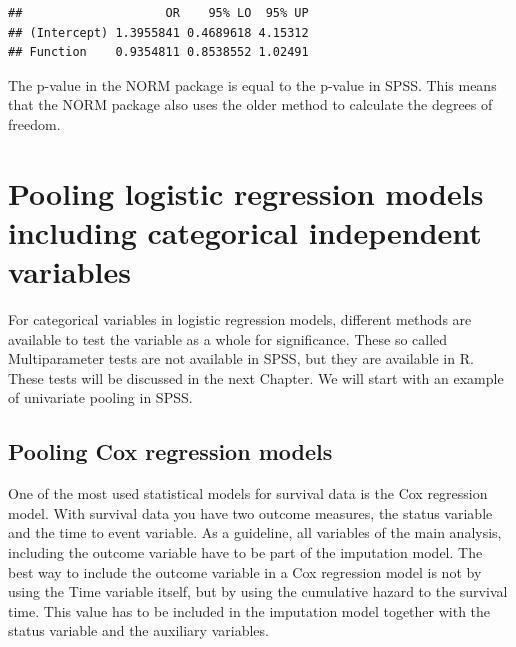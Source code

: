 \documentclass[]{book}
\newenvironment{Shaded}{\begin{snugshade}}{\end{snugshade}}
\newcommand{\KeywordTok}[1]{\textcolor[rgb]{0.13,0.29,0.53}{\textbf{#1}}}
\newcommand{\DecValTok}[1]{\textcolor[rgb]{0.00,0.00,0.81}{#1}}
\newcommand{\StringTok}[1]{\textcolor[rgb]{0.31,0.60,0.02}{#1}}
\newcommand{\OperatorTok}[1]{\textcolor[rgb]{0.81,0.36,0.00}{\textbf{#1}}}
\newcommand{\NormalTok}[1]{#1}
\begin{document}
\begin{Shaded}
\end{Shaded}

\begin{verbatim}
##                    OR    95% LO  95% UP
## (Intercept) 1.3955841 0.4689618 4.15312
## Function    0.9354811 0.8538552 1.02491
\end{verbatim}

The p-value in the NORM package is equal to the p-value in SPSS. This
means that the NORM package also uses the older method to calculate the
degrees of freedom.

\section{Pooling logistic regression models including categorical
independent
variables}\label{pooling-logistic-regression-models-including-categorical-independent-variables}

For categorical variables in logistic regression models, different
methods are available to test the variable as a whole for significance.
These so called Multiparameter tests are not available in SPSS, but they
are available in R. These tests will be discussed in the next Chapter.
We will start with an example of univariate pooling in SPSS.

\subsection{Pooling Cox regression
models}\label{pooling-cox-regression-models}

One of the most used statistical models for survival data is the Cox
regression model. With survival data you have two outcome measures, the
status variable and the time to event variable. As a guideline, all
variables of the main analysis, including the outcome variable have to
be part of the imputation model. The best way to include the outcome
variable in a Cox regression model is not by using the Time variable
itself, but by using the cumulative hazard to the survival time. This
value has to be included in the imputation model together with the
status variable and the auxiliary variables.
\end{document}
